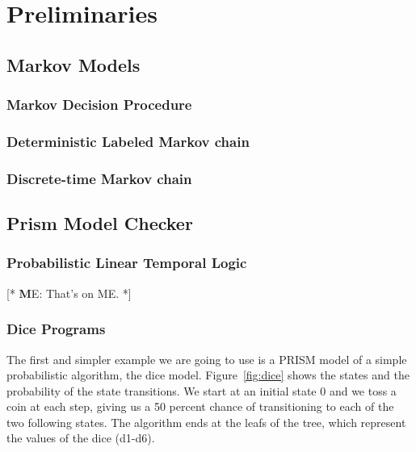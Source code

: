 \documentclass[
a4paper,
12pt
]{scrartcl}
\newcommand\me[1]{ [* {\textbf ME:} #1 *]}
\begin{document}
\par \me{here you have to reword parts of introduction of AALERGIA \cite{Mao.} that are relate to the incentives of devising such method; two or three paragraphs suffice.}

\newpage
\section{Preliminaries}
\subsection{Markov Models}
\subsubsection{Markov Decision Procedure}
\subsubsection{Deterministic Labeled Markov chain}
\subsubsection{Discrete-time Markov chain}
\subsection{Prism Model Checker}
\subsubsection{Probabilistic Linear Temporal Logic}
\me{That's on ME.}
\subsubsection{Dice Programs} \label{section:diceprograms}
The first and simpler example we are going to use is a PRISM model of a simple probabilistic algorithm, the dice model\cite{KY76}. Figure~\ref{fig:dice} shows the states and the probability of the state transitions. We start at an initial state 0 and we toss a coin at each step, giving us a 50 percent chance of transitioning to each of the two following states. The algorithm ends at the leafs of the tree, which represent the values of the dice (d1-d6).
\end{document}
